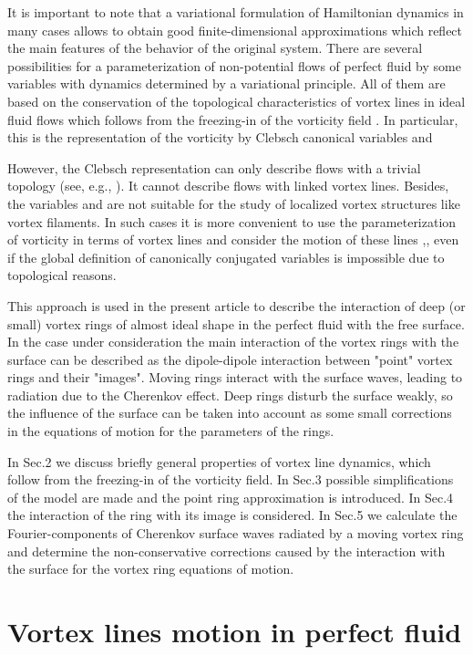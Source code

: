 It is important to note that a variational formulation
of Hamiltonian dynamics  in many cases allows to obtain good finite-dimensional
approximations which reflect the main features of the behavior of the original system.
There are several possibilities
for a parameterization of non-potential flows of perfect fluid by
some variables with dynamics determined by a variational principle.
All of them are based on the conservation of the topological characteristics
of vortex lines in ideal fluid flows which follows from the freezing-in of 
the vorticity field .
In particular, this is the representation of the vorticity 
by Clebsch canonical variables  and  
 

However, the Clebsch representation can only describe flows with 
a trivial topology (see, e.g., ). 
It cannot describe flows with linked vortex lines. Besides, the variables 
 and  are not suitable for the study of localized vortex 
structures like vortex filaments. In such cases it is more convenient to use 
the parameterization of vorticity in terms of vortex lines and
consider the motion of these lines ,, 
even if the global
definition of canonically conjugated variables is impossible due to 
topological reasons.

This approach is used in the present article to describe the interaction
of deep (or small) vortex rings of almost ideal shape 
in the perfect fluid with the free surface. 
In the case under consideration the main interaction of the vortex
rings with the surface can be described as the  dipole-dipole interaction 
between "point" vortex rings and their "images". Moving rings
interact with the surface waves, leading to radiation due to the Cherenkov effect. 
Deep rings disturb the surface weakly, so the influence of the surface
can be taken into account as some small corrections in the equations of motion
for the parameters of the rings.

In Sec.2 we discuss briefly general properties of vortex line dynamics, 
which follow from the freezing-in of the vorticity field.
In Sec.3 possible simplifications of the model are made 
and the point ring approximation is introduced.
In Sec.4 the interaction of the ring with its image is considered.
In Sec.5 we calculate the Fourier-components of Cherenkov surface waves 
radiated by a moving vortex ring 
and determine the non-conservative corrections caused by the 
interaction with the surface for the vortex ring equations of motion.


\section{Vortex lines motion in perfect fluid}

